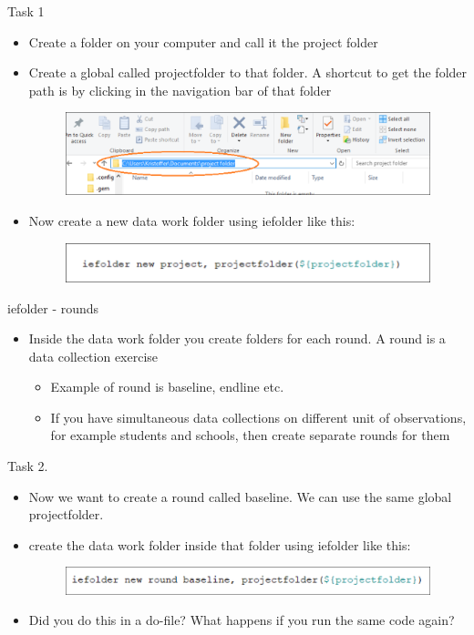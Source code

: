 \documentclass[aspectratio=169]{beamer}
\begin{document}
\begin{frame}{Task 1}
\begin{itemize}
	\item Create a folder on your computer and call it the project folder
	\item Create a global called projectfolder to that folder. A shortcut to get the folder path is by clicking in the navigation bar of that folder
		\begin{figure}
			\centering
			\includegraphics[width=\linewidth]{img/task1}
		\end{figure}
	\item Now create a new data work folder using iefolder like this:
		\begin{figure}
			\centering
			\includegraphics[width=\linewidth]{img/task1_2}
		\end{figure}
\end{itemize}
\end{frame}


\begin{frame}{iefolder - rounds}
\begin{itemize}
	\item Inside the data work folder you create folders for each round. A round is a data collection exercise
		\begin{itemize}
			\item 	Example of round is baseline, endline etc.
			\item If you have simultaneous data collections on different unit of observations, for example students and schools, then create separate rounds for them
		\end{itemize}
\end{itemize}
\end{frame}


\begin{frame}{Task 2.}
\begin{itemize}
	\item Now we want to create a round called baseline. We can use the same global projectfolder.
	\item create the data work folder inside that folder using iefolder like this:
		\begin{figure}
			\centering
			\includegraphics[width=\linewidth]{img/task2}
		\end{figure}
	\item Did you do this in a do-file? What happens if you run the same code again?
\end{itemize}
\end{frame}
\end{document}
